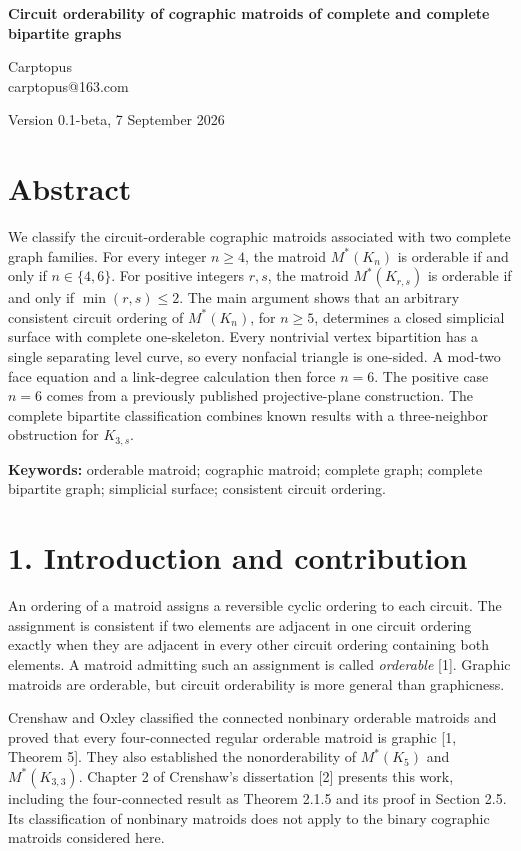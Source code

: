 \documentclass[11pt]{article}
\begin{document}
\begin{center}{\LARGE\bfseries Circuit orderability of cographic matroids of complete and complete bipartite graphs\par}\end{center}

Carptopus\\
carptopus@163.com

Version 0.1-beta, 7 September 2026

\section*{Abstract}

We classify the circuit-orderable cographic matroids associated with two complete graph families. For every integer $n\ge4$, the matroid $M^*(K_n)$ is orderable if and only if $n\in\{4,6\}$. For positive integers $r,s$, the matroid $M^*(K_{r,s})$ is orderable if and only if $\min(r,s)\le2$. The main argument shows that an arbitrary consistent circuit ordering of $M^*(K_n)$, for $n\ge5$, determines a closed simplicial surface with complete one-skeleton. Every nontrivial vertex bipartition has a single separating level curve, so every nonfacial triangle is one-sided. A mod-two face equation and a link-degree calculation then force $n=6$. The positive case $n=6$ comes from a previously published projective-plane construction. The complete bipartite classification combines known results with a three-neighbor obstruction for $K_{3,s}$.

\textbf{Keywords:} orderable matroid; cographic matroid; complete graph; complete bipartite graph; simplicial surface; consistent circuit ordering.

\section*{1. Introduction and contribution}

An ordering of a matroid assigns a reversible cyclic ordering to each circuit. The assignment is consistent if two elements are adjacent in one circuit ordering exactly when they are adjacent in every other circuit ordering containing both elements. A matroid admitting such an assignment is called \emph{orderable} [1]. Graphic matroids are orderable, but circuit orderability is more general than graphicness.

Crenshaw and Oxley classified the connected nonbinary orderable matroids and proved that every four-connected regular orderable matroid is graphic [1, Theorem 5]. They also established the nonorderability of $M^*(K_5)$ and $M^*(K_{3,3})$. Chapter 2 of Crenshaw's dissertation [2] presents this work, including the four-connected result as Theorem 2.1.5 and its proof in Section 2.5. Its classification of nonbinary matroids does not apply to the binary cographic matroids considered here.
\end{document}
